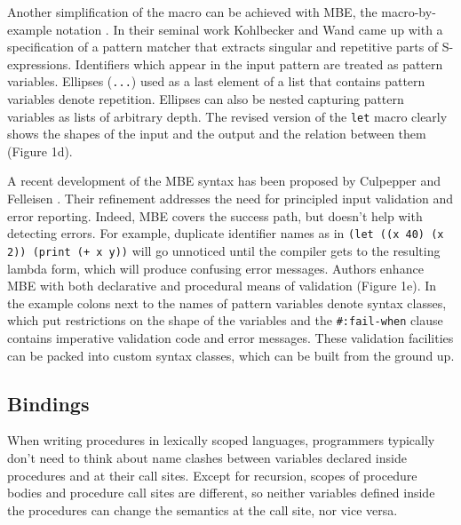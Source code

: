 \documentclass[10pt,journal,a4paper]{IEEEtran}
\begin{document}
Another simplification of the macro can be achieved with MBE, the macro-by-example notation
\cite{kohlbecker87}. In their seminal work Kohlbecker and Wand came up with a specification
of a pattern matcher that extracts singular and repetitive parts of S-expressions.
Identifiers which appear in the input pattern are treated as pattern variables.
Ellipses (\texttt{...}) used as a last element of a list that contains pattern variables
denote repetition. Ellipses can also be nested capturing pattern variables as lists of arbitrary depth.
The revised version of the \small \texttt{let} \normalsize macro clearly shows the shapes of the input
and the output and the relation between them (Figure 1d).

A recent development of the MBE syntax has been proposed by Culpepper and Felleisen \cite{culpepper10}.
Their refinement addresses the need for principled input validation and error reporting. Indeed,
MBE covers the success path, but doesn't help with detecting errors. For example,
duplicate identifier names as in \small \texttt{(let ((x 40) (x 2)) (print (+ x y))} \normalsize will go
unnoticed until the compiler gets to the resulting lambda form, which will produce
confusing error messages. Authors enhance MBE with both declarative and procedural
means of validation (Figure 1e). In the example colons next to the names of pattern variables
denote syntax classes,
which put restrictions on the shape of the variables and the \small \texttt{\#:fail-when} \normalsize
clause contains imperative validation code and error messages.
These validation facilities can be packed into custom syntax classes, which can be built from the ground up.

\subsection{Bindings}


When writing procedures in lexically scoped languages, programmers typically don't need to think
about name clashes between variables declared inside procedures and at their call sites.
Except for recursion, scopes of procedure bodies and procedure call sites are different, so
neither variables defined inside the procedures can change the semantics at the call site, nor vice versa.
\end{document}
